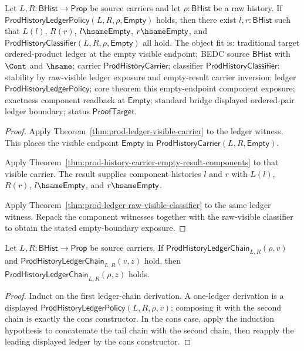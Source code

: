 \begin{theorem}
\label{thm:prod-ledger-visible-empty-component-exposure}
Let $L,R:\mathsf{BHist}\to\mathsf{Prop}$ be source carriers and let
$\rho:\mathsf{BHist}$ be a raw history. If
$\mathsf{ProdHistoryLedgerPolicy}(L,R,\rho,\mathsf{Empty})$ holds, then there
exist $l,r:\mathsf{BHist}$ such that $L(l)$, $R(r)$,
$l\hsame\mathsf{Empty}$, $r\hsame\mathsf{Empty}$, and
$\mathsf{ProdHistoryClassifier}(L,R,\rho,\mathsf{Empty})$ all hold. The object
fit is: traditional target ordered-product ledger at the empty visible
endpoint; BEDC source $\mathsf{BHist}$ with $\Cont$ and $\hsame$; carrier
$\mathsf{ProdHistoryCarrier}$; classifier $\mathsf{ProdHistoryClassifier}$;
stability by raw-visible ledger exposure and empty-result carrier inversion;
ledger $\mathsf{ProdHistoryLedgerPolicy}$; core theorem this empty-endpoint
component exposure; exactness component readback at $\mathsf{Empty}$; standard
bridge displayed ordered-pair ledger boundary; status $\mathsf{ProofTarget}$.
\end{theorem}
\begin{proof}
Apply Theorem~\ref{thm:prod-ledger-visible-carrier} to the ledger witness. This
places the visible endpoint $\mathsf{Empty}$ in
$\mathsf{ProdHistoryCarrier}(L,R,\mathsf{Empty})$.

Apply Theorem~\ref{thm:prod-history-carrier-empty-result-components} to that
visible carrier. The result supplies component histories $l$ and $r$ with
$L(l)$, $R(r)$, $l\hsame\mathsf{Empty}$, and $r\hsame\mathsf{Empty}$.

Apply Theorem~\ref{thm:prod-ledger-raw-visible-classifier} to the same ledger
witness. Repack the component witnesses together with the raw-visible
classifier to obtain the stated empty-boundary exposure.
\end{proof}

\begin{theorem}
\label{thm:prod-ledger-chain-transitivity}
Let $L,R:\mathsf{BHist}\to\mathsf{Prop}$ be source carriers. If
$\mathsf{ProdHistoryLedgerChain}_{L,R}(\rho,v)$ and
$\mathsf{ProdHistoryLedgerChain}_{L,R}(v,z)$ hold, then
$\mathsf{ProdHistoryLedgerChain}_{L,R}(\rho,z)$ holds.
\end{theorem}
\begin{proof}
Induct on the first ledger-chain derivation. A one-ledger derivation is a
displayed $\mathsf{ProdHistoryLedgerPolicy}(L,R,\rho,v)$; composing it with the
second chain is exactly the cons constructor. In the cons case, apply the
induction hypothesis to concatenate the tail chain with the second chain, then
reapply the leading displayed ledger by the cons constructor.
\end{proof}

